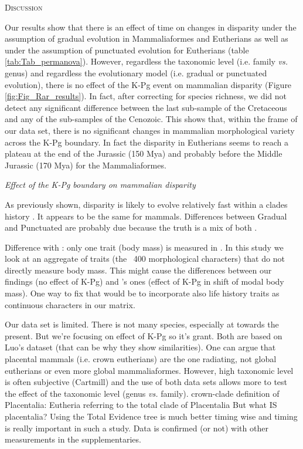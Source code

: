 \documentclass[12pt,letterpaper]{article}
\renewcommand{\section}[1]{%
\bigskip
\begin{center}
\begin{Large}
\normalfont\scshape #1
\medskip
\end{Large}
\end{center}}
\renewcommand{\subsection}[1]{%
\bigskip
\begin{center}
\begin{large}
\normalfont\itshape #1
\end{large}
\end{center}}
\begin{document}
\section{Discussion}
Our results show that there is an effect of time on changes in disparity under the assumption of gradual evolution in Mammaliaformes and Eutherians as well as under the assumption of punctuated evolution for Eutherians (table \ref{tab:Tab_permanova}).
However, regardless the taxonomic level (i.e. family \textit{vs.} genus) and regardless the evolutionary model (i.e. gradual or punctuated evolution), there is no effect of the K-Pg event on mammalian disparity (Figure \ref{fig:Fig_Rar_results}).
In fact, after correcting for species richness, we did not detect any significant difference between the last sub-sample of the Cretaceous and any of the sub-samples of the Cenozoic.
This shows that, within the frame of our data set, there is no significant changes in mammalian morphological variety across the K-Pg boundary.
In fact the disparity in Eutherians seems to reach a plateau at the end of the Jurassic (150 Mya) and probably before the Middle Jurassic (170 Mya) for the Mammaliaformes.

\subsection{Effect of the K-Pg boundary on mammalian disparity}
As previously shown, disparity is likely to evolve relatively fast within a clades history \cite{Hughes20082013}.
It appears to be the same for mammals.
Differences between Gradual and Punctuated are probably due because the truth is a mix of both \cite{Hunt21042015}.

Difference with \cite{Slater2012MEE}: only one trait (body mass) is measured in \cite{Slater2012MEE}. In this study we look at an aggregate of traits (the ~400 morphological characters) that do not directly measure body mass.
This might cause the differences between our findings (no effect of K-Pg) and \cite{Slater2012MEE}'s ones (effect of K-Pg in shift of modal body mass).
One way to fix that would be to incorporate also life history traits as continuous characters in our matrix. 

Our data set is limited.
There is not many species, especially at towards the present.
    But we're focusing on effect of K-Pg so it's grant.
Both are based on Luo's dataset (that can be why they show similarities).
One can argue that placental mammals (i.e. crown eutherians) are the one radiating, not global eutherians or even more global mammaliaformes.
However, high taxonomic level is often subjective (Cartmill) and the use of both data sets allows more to test the effect of the taxonomic level (genus \textit{vs.} family).
crown-clade definition of Placentalia: Eutheria referring to the total clade of Placentalia \citep{O'Leary08022013,beckancient2014}
But what IS placentalia? \cite{bininda2012rocking,Cartmill2012}
Using the Total Evidence tree is much better timing wise and timing is really important in such a study.
Data is confirmed (or not) with other measurements in the supplementaries.
\end{document}
